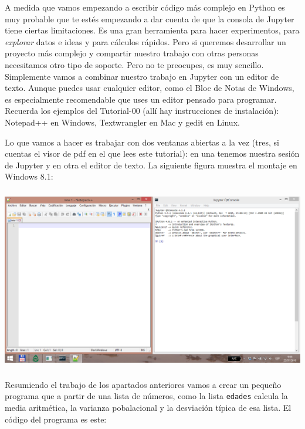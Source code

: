 \documentclass[10pt,a4paper]{article}\usepackage[]{graphicx}\usepackage[]{color}
\begin{document}
A medida que vamos empezando a escribir código más complejo en Python es muy probable que te estés empezando a dar cuenta de que la consola de Jupyter tiene ciertas limitaciones. Es una gran herramienta para hacer experimentos, para {\em explorar} datos e ideas y para cálculos rápidos. Pero si queremos desarrollar un proyecto más complejo y compartir nuestro trabajo con otras personas necesitamos otro tipo de soporte. Pero no te preocupes, es muy sencillo. Simplemente vamos a combinar nuestro trabajo en Jupyter con un editor de texto.  Aunque puedes usar cualquier editor, como el Bloc de Notas de Windows, es especialmente recomendable que uses un editor pensado para programar. Recuerda los ejemplos del Tutorial-00 (allí hay instrucciones de instalación): Notepad++ en Windows, Textwrangler en Mac y gedit en Linux.

Lo que vamos a hacer es trabajar con dos ventanas abiertas a la vez (tres, si cuentas el visor de pdf en el que lees este tutorial): en una tenemos nuestra sesión de Jupyter y en otra el editor de texto. La siguiente figura muestra el montaje en Windows 8.1:
\begin{center}
\includegraphics[height=8cm]{../fig/Tut02-py-06-EditorTextoJupyter.png}
\end{center}

Resumiendo el trabajo de los apartados anteriores vamos a crear un pequeño programa que a partir de una lista de números, como la lista {\tt edades} calcula la media aritmética, la varianza pobalacional y la desviación típica de esa lista. El código del programa es este:
\end{document}
